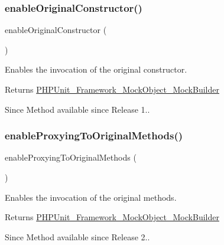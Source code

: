 \subsubsection{\texorpdfstring{enable\+Original\+Constructor()}{enableOriginalConstructor()}}
{\footnotesize\ttfamily enable\+Original\+Constructor (\begin{DoxyParamCaption}{ }\end{DoxyParamCaption})}

Enables the invocation of the original constructor.

\begin{DoxyReturn}{Returns}
\mbox{\hyperlink{class_p_h_p_unit___framework___mock_object___mock_builder}{P\+H\+P\+Unit\+\_\+\+Framework\+\_\+\+Mock\+Object\+\_\+\+Mock\+Builder}}
\end{DoxyReturn}
\begin{DoxySince}{Since}
Method available since Release 1.. 
\end{DoxySince}
\mbox{\label{class_p_h_p_unit___framework___mock_object___mock_builder_a5896d495f4fe2aa455c74a08316675b2}} 
\subsubsection{\texorpdfstring{enable\+Proxying\+To\+Original\+Methods()}{enableProxyingToOriginalMethods()}}
{\footnotesize\ttfamily enable\+Proxying\+To\+Original\+Methods (\begin{DoxyParamCaption}{ }\end{DoxyParamCaption})}

Enables the invocation of the original methods.

\begin{DoxyReturn}{Returns}
\mbox{\hyperlink{class_p_h_p_unit___framework___mock_object___mock_builder}{P\+H\+P\+Unit\+\_\+\+Framework\+\_\+\+Mock\+Object\+\_\+\+Mock\+Builder}}
\end{DoxyReturn}
\begin{DoxySince}{Since}
Method available since Release 2.. 
\end{DoxySince}
\mbox{\label{class_p_h_p_unit___framework___mock_object___mock_builder_a4021b0a3c532357b639924a072fa02c5}} 
